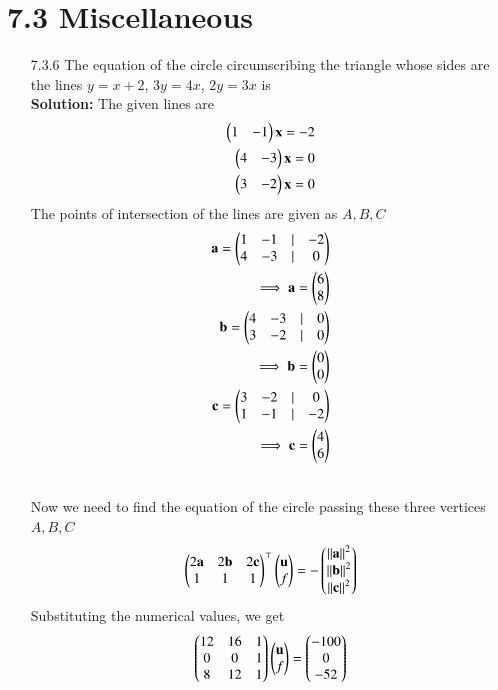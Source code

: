 \documentclass[journal]{IEEEtran}
\begin{document}
\section{7.3 Miscellaneous}
\begin{enumerate}
\item [7.3.6] The equation of the circle circumscribing the triangle whose sides are the lines
$y = x + 2$, $3y = 4x$, $2y = 3x$ is\\
\textbf{Solution:}
The given lines are
\begin{align}
    \begin{pmatrix}1 & -1\end{pmatrix} \mathbf{x} = -2\\
    \begin{pmatrix}4 & -3\end{pmatrix} \mathbf{x} = 0\\
    \begin{pmatrix}3 & -2\end{pmatrix} \mathbf{x} = 0
\end{align}
The points of intersection of the lines are given as $A, B, C$
\begin{align}
    \mathbf{a} = \begin{pmatrix}1 & -1 & \mid & -2\\4 & -3 & \mid & 0\end{pmatrix}\\
    \implies \mathbf{a} = \begin{pmatrix}6\\8\end{pmatrix}\\
    \mathbf{b} = \begin{pmatrix}4 & -3 & \mid & 0\\3 & -2 & \mid & 0\end{pmatrix}\\
    \implies \mathbf{b} = \begin{pmatrix}0\\0\end{pmatrix}\\
    \mathbf{c} = \begin{pmatrix}3 & -2 & \mid & 0\\1 & -1 & \mid & -2\end{pmatrix}\\
    \implies \mathbf{c} = \begin{pmatrix}4\\6\end{pmatrix}
\end{align}
\begin{table}[h!]
      \centering
      
      \caption{}
\end{table}\\
Now we need to find the equation of the circle passing these three vertices $A, B, C$
\begin{align}
    \begin{pmatrix}2\mathbf{a} & 2\mathbf{b} & 2\mathbf{c}\\1 & 1 & 1\end{pmatrix}^\top \begin{pmatrix}\mathbf{u}\\f\end{pmatrix} = -\begin{pmatrix}\left\vert\left\vert\mathbf{a}\right\vert\right\vert^2\\\left\vert\left\vert\mathbf{b}\right\vert\right\vert^2\\\left\vert\left\vert\mathbf{c}\right\vert\right\vert^2\end{pmatrix}
\end{align}
Substituting the numerical values, we get
\begin{align}
    \myvec{12 & 16 & 1\\0 & 0 & 1\\8 & 12 & 1}\myvec{\vec{u}\\f} = \myvec{-100\\0\\-52}\\

\end{align}
\end{enumerate}
\end{document}
